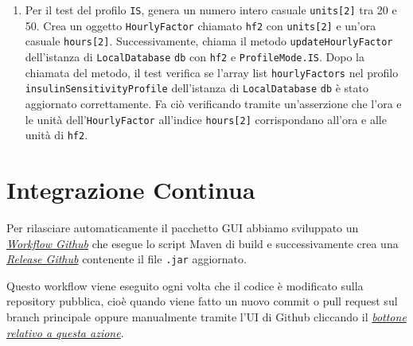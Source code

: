 \documentclass[twocolumn]{article}
\begin{document}
\begin{enumerate}
    \item Per il test del profilo \texttt{IS}, genera un numero intero casuale \texttt{units[2]} tra 20 e 50. Crea un oggetto \texttt{HourlyFactor} chiamato \texttt{hf2} con \texttt{units[2]} e un'ora casuale \texttt{hours[2]}. Successivamente, chiama il metodo \texttt{updateHourlyFactor} dell'istanza di \texttt{LocalDatabase} \texttt{db} con \texttt{hf2} e \texttt{ProfileMode.IS}. Dopo la chiamata del metodo, il test verifica se l'array list \texttt{hourlyFactors} nel profilo \texttt{insulinSensitivityProfile} dell'istanza di \texttt{LocalDatabase} \texttt{db} è stato aggiornato correttamente. Fa ciò verificando tramite un'asserzione che l'ora e le unità dell'\texttt{HourlyFactor} all'indice \texttt{hours[2]} corrispondano all'ora e alle unità di \texttt{hf2}.
\end{enumerate}

\newpage


\section{Integrazione Continua}

Per rilasciare automaticamente il pacchetto GUI abbiamo sviluppato un \href{https://docs.github.com/en/actions/using-workflows}{\textit{Workflow Github}} che esegue lo script Maven di build e successivamente crea una \href{https://docs.github.com/en/repositories/releasing-projects-on-github/managing-releases-in-a-repository}{\textit{Release Github}} contenente il file \texttt{.jar} aggiornato.

Questo workflow viene eseguito ogni volta che il codice è modificato sulla repository pubblica, cioè quando viene fatto un nuovo commit o pull request sul branch principale oppure manualmente tramite l'UI di Github cliccando il \href{https://docs.github.com/en/actions/using-workflows/manually-running-a-workflow}{\textit{bottone relativo a questa azione}}.

\vspace{2.4em}
\begin{figure}[!htbp]
    \centering
    
\end{figure}



\newpage

\listoffigures      %

\listoftables       %
\end{document}

